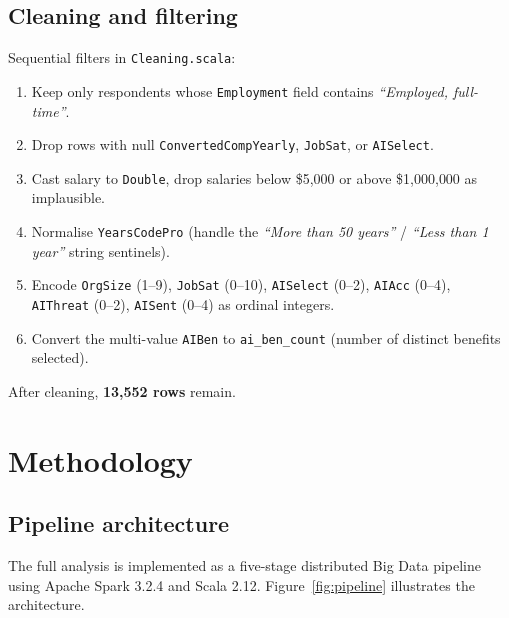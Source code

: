\documentclass[11pt,a4paper]{article}
\begin{document}
\subsection{Cleaning and filtering}

Sequential filters in \texttt{Cleaning.scala}:

\begin{enumerate}[leftmargin=2em]
  \item Keep only respondents whose \texttt{Employment} field contains
        \textit{``Employed, full-time''}.
  \item Drop rows with null \texttt{ConvertedCompYearly}, \texttt{JobSat},
        or \texttt{AISelect}.
  \item Cast salary to \texttt{Double}, drop salaries below \$5{,}000 or
        above \$1{,}000{,}000 as implausible.
  \item Normalise \texttt{YearsCodePro} (handle the
        \textit{``More than 50 years''} / \textit{``Less than 1 year''}
        string sentinels).
  \item Encode \texttt{OrgSize} (1--9), \texttt{JobSat} (0--10),
        \texttt{AISelect} (0--2), \texttt{AIAcc} (0--4), \texttt{AIThreat}
        (0--2), \texttt{AISent} (0--4) as ordinal integers.
  \item Convert the multi-value \texttt{AIBen} to \texttt{ai\_ben\_count}
        (number of distinct benefits selected).
\end{enumerate}

After cleaning, \textbf{13{,}552 rows} remain.

\section{Methodology}

\subsection{Pipeline architecture}

The full analysis is implemented as a five-stage distributed Big Data
pipeline using Apache Spark 3.2.4 and Scala 2.12.
Figure~\ref{fig:pipeline} illustrates the architecture.
\end{document}
